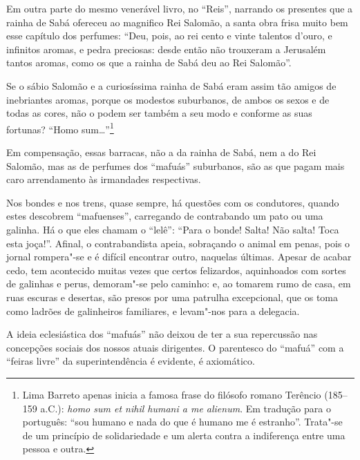 Em outra parte do mesmo venerável livro, no ``Reis'', narrando os
presentes que a rainha de Sabá ofereceu ao magnifico Rei Salomão, a
santa obra frisa muito bem esse capítulo dos perfumes: ``Deu, pois, ao
rei cento e vinte talentos d'ouro, e infinitos aromas, e pedra
preciosas: desde então não trouxeram a Jerusalém tantos aromas, como os
que a rainha de Sabá deu ao Rei Salomão''.

Se o sábio Salomão e a curiosíssima rainha de Sabá eram assim tão amigos
de inebriantes aromas, porque os modestos suburbanos, de ambos os sexos
e de todas as cores, não o podem ser também a seu modo e conforme as
suas fortunas? ``Homo sum\ldots{}''\footnote{Lima Barreto apenas inicia a
  famosa frase do filósofo romano Terêncio (185--159 a.C.):
  \emph{homo sum et nihil humani a me alienum}. Em tradução para o
  português: ``sou humano e nada do que é humano me é estranho''.
  Trata"-se de um princípio de solidariedade e um alerta contra a
  indiferença entre uma pessoa e outra.}

Em compensação, essas barracas, não a da rainha de Sabá, nem a do Rei
Salomão, mas as de perfumes dos ``mafuás'' suburbanos, são as que pagam
mais caro arrendamento às irmandades respectivas.


Nos bondes e nos trens, quase sempre, há questões com os condutores,
quando estes descobrem ``mafuenses'', carregando de contrabando um pato
ou uma galinha. Há o que eles chamam o ``lelê'': ``Para o bonde! Salta!
Não salta! Toca esta joça!''. Afinal, o contrabandista apeia, sobraçando
o animal em penas, pois o jornal rompera"-se e é difícil encontrar outro,
naquelas últimas. Apesar de acabar cedo, tem acontecido muitas vezes que
certos felizardos, aquinhoados com sortes de galinhas e perus,
demoram"-se pelo caminho: e, ao tomarem rumo de casa, em ruas escuras e
desertas, são presos por uma patrulha excepcional, que os toma como
ladrões de galinheiros familiares, e levam"-nos para a delegacia.

A ideia eclesiástica dos ``mafuás'' não deixou de ter a sua repercussão
nas concepções sociais dos nossos atuais dirigentes. O parentesco do
``mafuá'' com a ``feiras livre'' da superintendência é evidente, é
axiomático.

